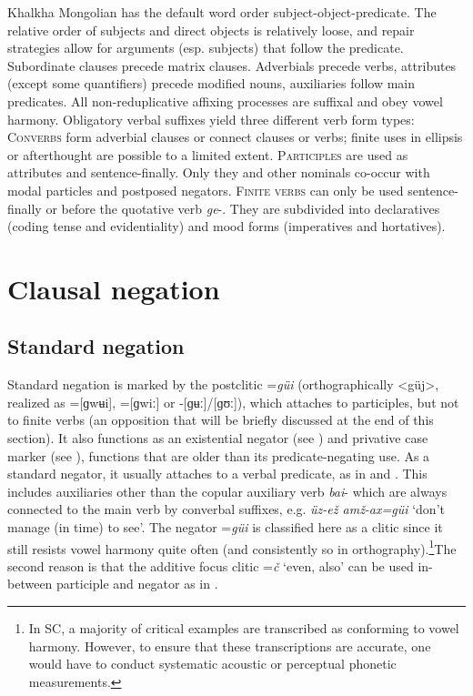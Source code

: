 \documentclass[output=paper,colorlinks,citecolor=brown,chinesefont]{langscibook}
\begin{document}
Khalkha Mongolian has the default word order subject-object-predicate. The relative order of subjects and direct objects is relatively loose, and repair strategies allow for arguments (esp. subjects) that follow the predicate. Subordinate clauses precede matrix clauses. Adverbials precede verbs, attributes (except some quantifiers) precede modified nouns, auxiliaries follow main predicates. All non-reduplicative affixing processes are suffixal and obey vowel harmony. Obligatory verbal suffixes yield three different verb form types: \textsc{Converbs} form adverbial clauses or connect clauses or verbs; finite uses in ellipsis or afterthought are possible to a limited extent. \textsc{Participles} are used as attributes and sentence-finally. Only they and other nominals co-occur with modal particles and postposed negators. \textsc{Finite} \textsc{verbs} can only be used sentence-finally or before the quotative verb \textit{ge}{}-. They are subdivided into declaratives (coding tense and evidentiality) and mood forms (imperatives and hortatives). 

\section{Clausal negation}\label{sec:kha:2}
\subsection{Standard negation}\label{sec:kha:2.1}

Standard negation is marked by the postclitic =\textit{güi} (orthographically <güj>, realized as =[ɡwʉi], =[ɡwiː] or -[ɡʉː]/[ɡʊː]), which attaches to participles, but not to finite verbs (an opposition that will be briefly discussed at the end of this section). It also functions as an existential negator (see ) and privative case marker (see ), functions that are older than its predicate-negating use. As a standard negator, it usually attaches to a verbal predicate, as in  and . This includes auxiliaries other than the copular auxiliary verb \textit{bai}{}- which are always connected to the main verb by converbal suffixes, e.g. \textit{üz-ež amž-ax=güi} ‘don’t manage (in time) to see’. The negator =\textit{güi} is classified here as a clitic since it still resists vowel harmony quite often (and consistently so in orthography).\footnote{In SC, a majority of critical examples are transcribed as conforming to vowel harmony. However, to ensure that these transcriptions are accurate, one would have to conduct systematic acoustic or perceptual phonetic measurements.}The second reason is that the additive focus clitic =\textit{č} ‘even, also’ can be used in-between participle and negator as in .
\end{document}

